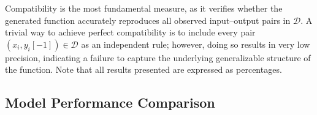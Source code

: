 Compatibility is the most fundamental measure, as it verifies whether the generated function accurately reproduces all observed input–output pairs in $\mathcal{D}$. A trivial way to achieve perfect compatibility is to include every pair $(x_i, y_i[-1])\in \mathcal{D}$ as an independent rule; however, doing so results in very low precision, indicating a failure to capture the underlying generalizable structure of the function. Note that all results presented are expressed as percentages.

\subsection{Model Performance Comparison}
\begin{table*}[!ht]
    \centering
    \renewcommand{\arraystretch}{1.1}
    \caption{Zero-shot CoT benchmark result with $k = 4$, $|\Sigma|$ = 4, number of rules = 3, sample size = 2}
    \vspace{-10pt}
    \label{tab:main}
\end{table*}
